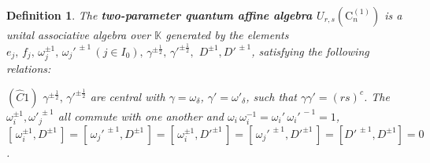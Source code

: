 \documentclass{amsproc}
\newtheorem{defi}[theo]{Definition}
\theoremstyle{remark}
\numberwithin{equation}{section}
\begin{document}
\begin{defi} {\it The {\bf two-parameter quantum affine algebra
 $U_{r,s}(\mathrm{C}_n^{(1)})$} is a unital associative
algebra over $\mathbb{K}$ generated by the elements $e_j,\, f_j,\,
\omega_j^{\pm 1},\, \omega_j'^{\,\pm 1}\, (j\in I_0),\,
\gamma^{\pm\frac{1}2},\,\gamma'^{\pm\frac{1}2},$ $D^{\pm1},
D'^{\,\pm1}$, satisfying the following relations:
\medskip

\noindent
$(\hat{C}1)$
$\gamma^{\pm\frac{1}2},\,\gamma'^{\pm\frac{1}2}$
are central with $\gamma={\omega}_\delta$, $\gamma'={\omega}'_\delta$, such
that $\gamma\gamma'=(rs)^c$. The $\omega_i^{\pm 1}, {\omega'}_j^{\,\pm
1}$ all commute with one another and
$\omega_i\,\omega_i^{-1}=\omega_i'\,\omega_i'^{\,-1}=1$,
$[\,{\omega}_i^{\pm1}, D^{\pm1}\,]=[\,{\omega}_j'^{\,\pm1},
D^{\pm1}\,]=[\,{\omega}_i^{\pm1}, D'^{\pm1}\,]=[\,{\omega}_j'^{\,\pm1},
D'^{\pm1}\,]=[D'^{\,\pm1},
D^{\pm1}]=0$.\\

}
\end{defi}
\end{document}
